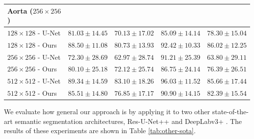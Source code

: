 \begin{table}[t!]
\begin{tabularx}{\textwidth}{lCCCC}
\toprule
\textbf{Aorta} ($256 \times 256$) & & & & \\
\midrule
$128 \times 128$ - U-Net & $81.03 \pm 14.45$ & $70.13 \pm 17.02$ & $85.09 \pm 14.14$ & $78.30 \pm 15.04$ \\
$128 \times 128$ - Ours & $88.50 \pm 11.08$ & $80.73 \pm 13.93$ & $92.42 \pm 10.33$ & $86.02 \pm 12.25$ \\
\midrule
$256 \times 256$ - U-Net & $72.30 \pm 28.69$ & $62.97 \pm 28.74$ & $91.21 \pm 25.39$ & $63.80 \pm 29.11$ \\
$256 \times 256$ - Ours & $80.10 \pm 25.18$ & $72.12 \pm 25.74$ & $86.75 \pm 24.14$ & $76.39 \pm 26.51$ \\
\midrule
$512 \times 512$ - U-Net & $89.34 \pm 14.59$ & $83.10 \pm 18.26$ & $96.03 \pm 11.52$ & $85.66 \pm 17.44$ \\
$512 \times 512$ - Ours & $85.51 \pm 14.80$ & $76.85 \pm 17.17$ & $90.90 \pm 14.15$ & $82.39 \pm 15.54$ \\
		\end{tabularx}
\end{table}

We evaluate how general our approach is by applying it to two other state-of-the-art semantic segmentation architectures, Res-U-Net++ \cite{jhaResUNetAdvancedArchitecture2019, zhouUNetNestedUNet2018b} and DeepLabv3+ \cite{chenEncoderDecoderAtrousSeparable2018b}. The results of these experiments are shown in Table \ref{tab:other-sota}.

